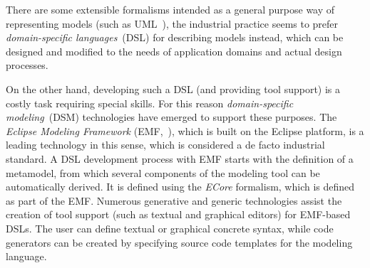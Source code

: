 There are some extensible formalisms intended as a general purpose way of representing models (such as UML~\cite{UML:Spec}), the industrial practice seems to prefer \emph{domain-specific languages}~(DSL) for describing models instead, which can be designed and modified to the needs of application domains and actual design processes. 

On the other hand, developing such a DSL (and providing tool support) is a costly task requiring special skills. For this reason \emph{domain-specific modeling}~(DSM) technologies have emerged to support these purposes. The \emph{Eclipse Modeling Framework} (EMF,~\cite{EMFAPI}), which is built on the Eclipse platform, is a leading technology in this sense, which is considered a de facto industrial standard. A DSL development process with EMF starts with the definition of a metamodel, from which several components of the modeling tool can be automatically derived. It is defined using the \emph{ECore} formalism, which is defined as part of the EMF. Numerous generative and generic technologies assist the creation of tool support (such as textual and graphical editors) for EMF-based DSLs. The user can define textual or graphical concrete syntax, while code generators can be created by specifying source code templates for the modeling language. 






